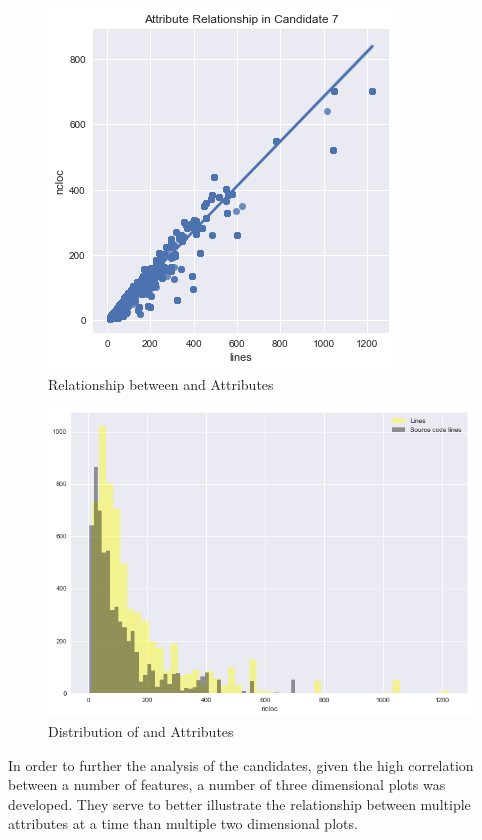 \begin{enumerate}
\begin{figure}
    \centering
    \includegraphics[scale=0.7]{Figures/correlation/Attribute_Relationship_in_Candidate_7.png}
    \caption{Relationship between \ncloc{} and \lines{} Attributes}
    \label{fig:candidate7-scatterplot}
\end{figure}

\begin{figure}
    \centering
    \includegraphics[scale=0.6]{Figures/correlation/Attribute_Distribution_in_Candidate_7.png}
    \caption{Distribution of \ncloc{} and \lines{} Attributes}
    \label{fig:candidate7-distribution}
\end{figure}


In order to further the analysis of the candidates, given the high correlation between a number of features, a number of three dimensional plots was developed. They serve to better illustrate the relationship between multiple attributes at a time than multiple two dimensional plots.


\end{enumerate}
